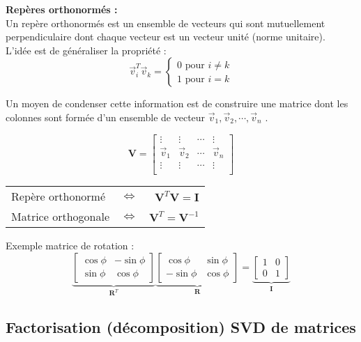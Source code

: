 \documentclass[document.tex]{subfiles}
\begin{document}
\textbf{Repères orthonormés :}\\
Un repère orthonormés est un ensemble de vecteurs qui sont mutuellement perpendiculaire dont chaque vecteur est un vecteur unité (norme unitaire).\\

L'idée est de généraliser la propriété :
$$\vec{v}_i^T \vec{v}_k = \begin{cases} 0 \text{ pour $i \neq k$} \\ 1 \text{ pour $i = k$} \end{cases} $$

Un moyen de condenser cette information est de construire une matrice dont les colonnes sont formée d'un ensemble de vecteur $\vec{v}_1,\vec{v}_2,\cdots,\vec{v}_n$ .

$$ \textbf{V} = \begin{bmatrix}
\vdots & \vdots & \cdots & \vdots \\
\vec{v}_1 & \vec{v}_2 & \cdots & \vec{v}_n \\
\vdots & \vdots & \cdots & \vdots \\
\end{bmatrix}$$

\begin{tabular}{l c r}
Repère orthonormé & $\Leftrightarrow$ & $\boxed{\textbf{V}^T\textbf{V}= \textbf{I}}$ \\ [6pt]
Matrice orthogonale & $\Leftrightarrow$ & $\boxed{\textbf{V}^T=\textbf{V}^{-1}}$ \\[12pt]
\end{tabular}


Exemple matrice de rotation : 
$$\underbrace{\begin{bmatrix}
\cos \phi & -\sin \phi \\ \sin \phi & \cos \phi
\end{bmatrix}}_{\textbf{R}^T} \underbrace{\begin{bmatrix}
\cos \phi & \sin \phi \\ -\sin \phi & \cos \phi
\end{bmatrix}}_{\textbf{R}} = \underbrace{\begin{bmatrix}
1 & 0 \\ 0 & 1 \end{bmatrix}}_{\textbf{I}}$$


\subsection{Factorisation (décomposition) SVD de matrices}
\end{document}
